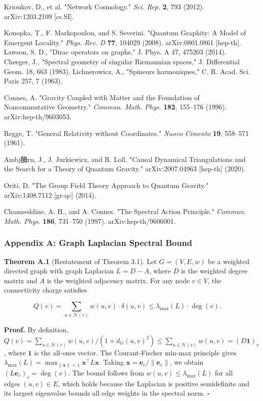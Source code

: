 \documentclass[11pt,a4paper]{article}
\theoremstyle{plain}
\theoremstyle{definition}
\begin{document}
\cite{Krioukov2012} Krioukov, D., et al. "Network Cosmology." \textit{Sci. Rep.} \textbf{2}, 793 (2012). arXiv:1203.2109 [cs.SI].

\cite{Konopka2008} Konopka, T., F. Markopoulou, and S. Severini. "Quantum Graphity: A Model of Emergent Locality." \textit{Phys. Rev. D} \textbf{77}, 104029 (2008). arXiv:0801.0861 [hep-th].
\cite{Chomiuk2026} Lawson, S. D., "Dirac operators on graphs," J. Phys. A 47, 475203 (2014).
\cite{Connes1996} Cheeger, J., "Spectral geometry of singular Riemannian spaces," J. Differential Geom. 18, 663 (1983).
\cite{Regge1961} Lichnerowicz, A., "Spineurs harmoniques," C. R. Acad. Sci. Paris 257, 7 (1963).

\cite{Ambjorn2020} Connes, A. "Gravity Coupled with Matter and the Foundation of Noncommutative Geometry." \textit{Commun. Math. Phys.} \textbf{182}, 155–176 (1996). arXiv:hep-th/9603053.

\cite{Regge1961} Regge, T. "General Relativity without Coordinates." \textit{Nuovo Cimento} \textbf{19}, 558–571 (1961).

\cite{Oriti2014} Ambj酶rn, J., J. Jurkiewicz, and R. Loll. "Causal Dynamical Triangulations and the Search for a Theory of Quantum Gravity." arXiv:2007.04963 [hep-th] (2020).

\cite{Chamseddine1997} Oriti, D. "The Group Field Theory Approach to Quantum Gravity." arXiv:1408.7112 [gr-qc] (2014).

\cite{Ambjorn2020} Chamseddine, A. H., and A. Connes. "The Spectral Action Principle." \textit{Commun. Math. Phys.} \textbf{186}, 731–750 (1997). arXiv:hep-th/9606001.

\textemdash{}

\subsubsection{Appendix A: Graph Laplacian Spectral Bound}

\textbf{Theorem A.1} (Restatement of Theorem 3.1). Let $G = (V, E, w)$ be a weighted directed graph with graph Laplacian $L = D - A$, where $D$ is the weighted degree matrix and $A$ is the weighted adjacency matrix. For any node $v \in V$, the connectivity charge satisfies

$$Q(v) = \sum_{u \in \mathcal{N}(v)} w(u,v) \cdot \delta(u,v) \leq \lambda_{\max}(L) \cdot \deg(v).$$

\textbf{Proof.} By definition, $Q(v) = \sum_{u \in \mathcal{N}(v)} w(u,v) / (1 + d_G(u,v)^2) \leq \sum_{u \in \mathcal{N}(v)} w(u,v) = (D\mathbf{1})_v$, where $\mathbf{1}$ is the all-ones vector. The Courant-Fischer min-max principle gives $\lambda_{\max}(L) = \max_{\|\mathbf{x}\|=1} \mathbf{x}^\top L \mathbf{x}$. Taking $\mathbf{x} = \mathbf{e}_v / \|\mathbf{e}_v\|$, we obtain $(L\mathbf{e}_v)_v = \deg(v)$. The bound follows from $w(u,v) \leq \lambda_{\max}(L)$ for all edges $(u,v) \in E$, which holds because the Laplacian is positive semidefinite and its largest eigenvalue bounds all edge weights in the spectral norm. $\square$
\end{document}
